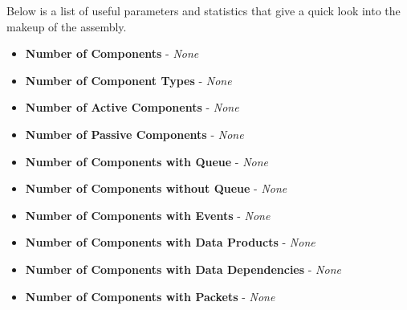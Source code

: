 Below is a list of useful parameters and statistics that give a quick look into the makeup of the assembly.

\begin{itemize}

  \item \textbf{Number of Components} - 
    \textit{None}

  \item \textbf{Number of Component Types} - 
    \textit{None}

  \item \textbf{Number of Active Components} - 
    \textit{None}

  \item \textbf{Number of Passive Components} - 
    \textit{None}

   \item \textbf{Number of Components with Queue} - 
    \textit{None}

  \item \textbf{Number of Components without Queue} - 
    \textit{None}

  \item \textbf{Number of Components with Events} - 
    \textit{None}

  \item \textbf{Number of Components with Data Products} - 
    \textit{None}

  \item \textbf{Number of Components with Data Dependencies} - 
    \textit{None}

  \item \textbf{Number of Components with Packets} - 
    \textit{None}


\end{itemize}
